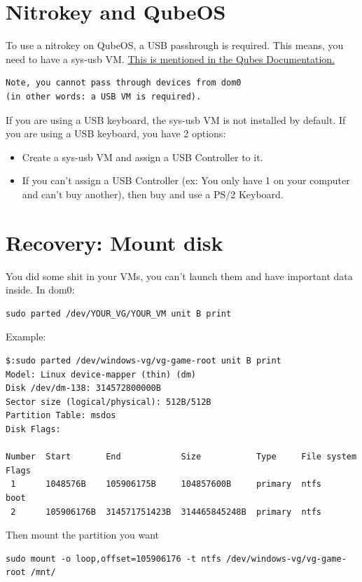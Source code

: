\documentclass[12pt]{article}
\begin{document}
\section{Nitrokey and QubeOS}
To use a nitrokey on QubeOS, a USB passhrough is required.
This means, you need to have a sys-usb VM.
\href{https://www.qubes-os.org/doc/usb/\#attaching-a-single-usb-device-to-a-qube-usb-passthrough}{This is mentioned in the Qubes Documentation.}
\begin{verbatim}
Note, you cannot pass through devices from dom0
(in other words: a USB VM is required).
\end{verbatim}
If you are using a USB keyboard, the sys-usb VM is not installed by default.
If you are using a USB keyboard, you have 2 options:
\begin{itemize}
\item Create a sys-usb VM and assign a USB Controller to it.
\item If you can't assign a USB Controller (ex: You only have 1 on your computer and can't buy another), then buy and use a PS/2 Keyboard.
\end{itemize}

\section{Recovery: Mount disk}
You did some shit in your VMs, you can't launch them and have important data inside.
In dom0:

\begin{verbatim}
sudo parted /dev/YOUR_VG/YOUR_VM unit B print
\end{verbatim}

Example:

\begin{verbatim}
$:sudo parted /dev/windows-vg/vg-game-root unit B print
Model: Linux device-mapper (thin) (dm)
Disk /dev/dm-138: 314572800000B
Sector size (logical/physical): 512B/512B
Partition Table: msdos
Disk Flags:

Number  Start       End            Size           Type     File system  Flags
 1      1048576B    105906175B     104857600B     primary  ntfs         boot
 2      105906176B  314571751423B  314465845248B  primary  ntfs
\end{verbatim}

Then mount the partition you want

\begin{verbatim}
sudo mount -o loop,offset=105906176 -t ntfs /dev/windows-vg/vg-game-root /mnt/
\end{verbatim}
\end{document}
